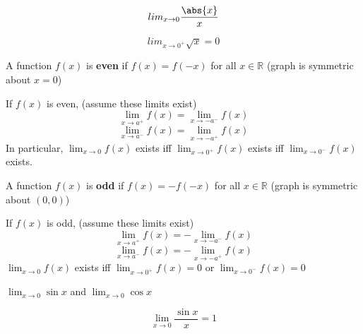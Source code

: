 \begin{exmp}
\[lim_{x\to 0} \frac{\abs{x}}{x}\]
\end{exmp}

\begin{exmp}
\[lim_{x\to 0^+} \sqrt{x} = 0\]
\end{exmp}

\begin{defn}
A function $f(x)$ is \textbf{even} if $f(x) = f(-x)$ for all $x\in\mathbb{R}$ (graph is symmetric about $x=0$)
\end{defn}

\begin{note}
If $f(x)$ is even, (assume these limits exist)
\[\lim_{x\to a^+} f(x) = \lim_{x\to -a^-} f(x)\]
\[\lim_{x\to a^-} f(x) = \lim_{x\to -a^+} f(x)\]
In particular, $\lim_{x\to 0} f(x)$ exists iff $\lim_{x\to 0^+} f(x)$ exists iff $\lim_{x\to 0^-} f(x)$ exists.
\end{note}

\begin{defn}
A function $f(x)$ is \textbf{odd} if $f(x) = -f(-x)$ for all $x\in\mathbb{R}$ (graph is symmetric about $(0,0)$)
\end{defn}
\begin{note}
If $f(x)$ is odd, (assume these limits exist)
\[\lim_{x\to a^+} f(x) = -\lim_{x\to -a^-} f(x)\]
\[\lim_{x\to a^-} f(x) = -\lim_{x\to -a^+} f(x)\]
$\lim_{x\to 0} f(x)$ exists iff $\lim_{x\to 0^+} f(x) = 0$ or $\lim_{x\to 0^-} f(x) = 0$
\end{note}

\begin{exmp}
$\lim_{x\to 0} \sin x$ and $\lim_{x\to 0} \cos x$
\end{exmp}

\begin{exmp}
\[\lim_{x\to 0} \frac{\sin x}{x} = 1\]
\end{exmp}